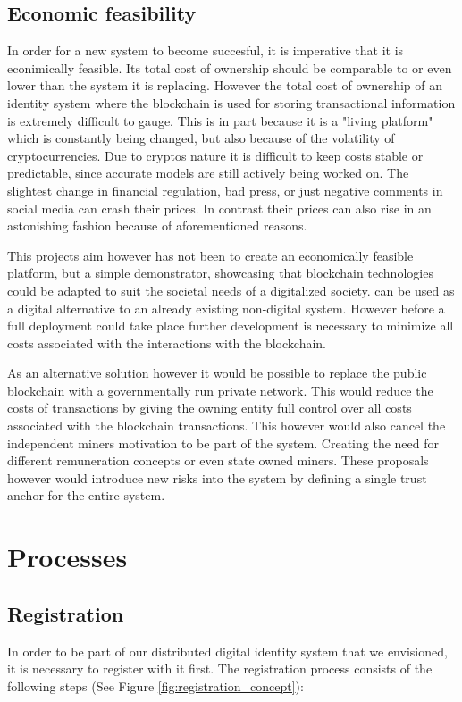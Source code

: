 \subsection{Economic feasibility}
\label{sec:economicFeasibility}
In order for a new system to become succesful, it is imperative that it is econimically feasible. Its total cost of ownership should be comparable to or even lower than the system it is replacing.
However the total cost of ownership of an identity system where the blockchain is used for storing transactional information is extremely difficult to gauge. This is in part because it is a "living platform" which is constantly being changed, but also because of the volatility of cryptocurrencies.\cite{elendner2016cross}
Due to cryptos nature it is difficult to keep costs stable or predictable, since accurate models are still actively being worked on.\cite{catania2018predicting} The slightest change in financial regulation, bad press, or just negative comments in social media can crash their prices.\cite{kim2016predicting}
In contrast their prices can also rise in an astonishing fashion because of aforementioned reasons. 

This projects aim however has not been to create an economically feasible platform, but a simple demonstrator, showcasing that blockchain technologies could be adapted to suit the societal needs of a digitalized society. \projectName{} can be used as a digital alternative to an already existing non-digital system.
However before a full deployment could take place further development is necessary to minimize all costs associated with the interactions with the blockchain.

As an alternative solution however it would be possible to replace the public blockchain with a governmentally run private network. This would reduce the costs of transactions by giving the owning entity full control over all costs associated with the blockchain transactions.
This however would also cancel the independent miners motivation to be part of the system. Creating the need for different remuneration concepts or even state owned miners. These proposals however would introduce new risks into the system by defining a single trust anchor for the entire system. 

\section{Processes}

\subsection{Registration}
In order to be part of our distributed digital identity system that we envisioned, it is necessary to register with it first. The registration process consists of the following steps (See Figure \ref{fig:registration_concept}):


